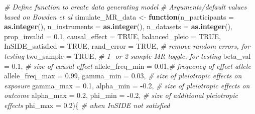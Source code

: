 \documentclass[
]{article}
\newenvironment{Shaded}{\begin{snugshade}}{\end{snugshade}}
\newcommand{\AttributeTok}[1]{\textcolor[rgb]{0.13,0.29,0.53}{#1}}
\newcommand{\CommentTok}[1]{\textcolor[rgb]{0.56,0.35,0.01}{\textit{#1}}}
\newcommand{\ConstantTok}[1]{\textcolor[rgb]{0.56,0.35,0.01}{#1}}
\newcommand{\ControlFlowTok}[1]{\textcolor[rgb]{0.13,0.29,0.53}{\textbf{#1}}}
\newcommand{\FloatTok}[1]{\textcolor[rgb]{0.00,0.00,0.81}{#1}}
\newcommand{\FunctionTok}[1]{\textcolor[rgb]{0.13,0.29,0.53}{\textbf{#1}}}
\newcommand{\NormalTok}[1]{#1}
\newcommand{\OtherTok}[1]{\textcolor[rgb]{0.56,0.35,0.01}{#1}}
\newcommand{\SpecialCharTok}[1]{\textcolor[rgb]{0.81,0.36,0.00}{\textbf{#1}}}
\begin{document}
\begin{Shaded}
\begin{Highlighting}[]
\CommentTok{\# Define function to create data generating model}
\CommentTok{\# Arguments/default values based on Bowden et al}
\NormalTok{ simulate\_MR\_data }\OtherTok{\textless{}{-}} \ControlFlowTok{function}\NormalTok{(}\AttributeTok{n\_participants =} \FunctionTok{as.integer}\NormalTok{(),}
                              \AttributeTok{n\_instruments =} \FunctionTok{as.integer}\NormalTok{(),}
                              \AttributeTok{n\_datasets =} \FunctionTok{as.integer}\NormalTok{(),}
                              \AttributeTok{prop\_invalid =} \FloatTok{0.1}\NormalTok{,}
                              \AttributeTok{causal\_effect =} \ConstantTok{TRUE}\NormalTok{,}
                              \AttributeTok{balanced\_pleio =} \ConstantTok{TRUE}\NormalTok{,}
                              \AttributeTok{InSIDE\_satisfied =} \ConstantTok{TRUE}\NormalTok{,}
                              \AttributeTok{rand\_error =} \ConstantTok{TRUE}\NormalTok{,     }\CommentTok{\# remove random errors, for testing}
                              \AttributeTok{two\_sample =} \ConstantTok{TRUE}\NormalTok{,     }\CommentTok{\# 1{-} or 2{-}sample MR toggle, for testing}
                              \AttributeTok{beta\_val =} \FloatTok{0.1}\NormalTok{,        }\CommentTok{\# size of causal effect}
                              \AttributeTok{allele\_freq\_min =} \FloatTok{0.01}\NormalTok{,}\CommentTok{\# frequency of effect allele}
                              \AttributeTok{allele\_freq\_max =} \FloatTok{0.99}\NormalTok{,}
                              \AttributeTok{gamma\_min =} \FloatTok{0.03}\NormalTok{,      }\CommentTok{\# size of pleiotropic effects on exposure}
                              \AttributeTok{gamma\_max =} \FloatTok{0.1}\NormalTok{,}
                              \AttributeTok{alpha\_min =} \SpecialCharTok{{-}}\FloatTok{0.2}\NormalTok{,      }\CommentTok{\# size of pleiotropic effects on outcome}
                              \AttributeTok{alpha\_max =} \FloatTok{0.2}\NormalTok{,}
                              \AttributeTok{phi\_min =} \SpecialCharTok{{-}}\FloatTok{0.2}\NormalTok{,        }\CommentTok{\# size of additional pleiotropic effects}
                              \AttributeTok{phi\_max =} \FloatTok{0.2}\NormalTok{)\{        }\CommentTok{\# when InSIDE not satisfied}




\end{Highlighting}
\end{Shaded}
\end{document}
